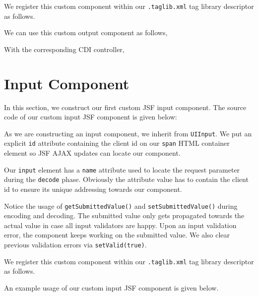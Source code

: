 We register this custom component within our \texttt{.taglib.xml} tag library descriptor as follows.


We can use this custom output component as follows,


With the corresponding CDI controller,



\section{Input Component}
In this section, we construct our first custom JSF input component.
The source code of our custom input JSF component is given below:

As we are constructing an input component, we inherit from \texttt{UIInput}.
We put an explicit \texttt{id} attribute containing the client id on our \texttt{span} HTML container element so JSF AJAX updates can locate our component.

Our \texttt{input} element has a \texttt{name} attribute used to locate the request parameter during the \texttt{decode} phase.
Obviously the attribute value has to contain the client id to ensure its unique addressing towards our component.

Notice the usage of \texttt{getSubmittedValue()} and \texttt{setSubmittedValue()} during encoding and decoding.
The submitted value only gets propagated towards the actual value in case all input validators are happy.
Upon an input validation error, the component keeps working on the submitted value.
We also clear previous validation errors via \texttt{setValid(true)}.

We register this custom component within our \texttt{.taglib.xml} tag library descriptor as follows.


An example usage of our custom input JSF component is given below.


